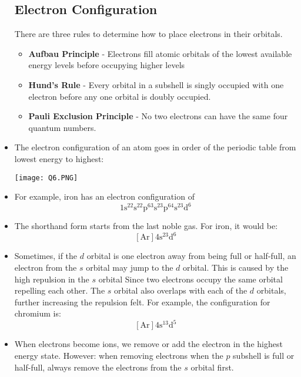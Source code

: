 \documentclass{article}
\begin{document}
\begin{itemize}
    \subsection{Electron Configuration}
    \begin{review}
        There are three rules to determine how to place electrons in their orbitals.
        \begin{itemize}
            \item \textbf{Aufbau Principle} - Electrons fill atomic orbitals of the lowest available energy levels before occupying higher levels
            \item \textbf{Hund's Rule} - Every orbital in a subshell is singly occupied with one electron before any one orbital is doubly occupied.
            \item \textbf{Pauli Exclusion Principle} - No two electrons can have the same four quantum numbers.
        \end{itemize}
    \end{review}
    \item The electron configuration of an atom goes in order of the periodic table from lowest energy to highest:
    \begin{center}\texttt{[image: Q6.PNG]}\end{center}
    \item For example, iron has an electron configuration of
    $$\mathrm{1s^22s^22p^63s^23p^64s^23d^6}$$
    \item The shorthand form starts from the last noble gas. For iron, it would be:
    $$\mathrm{[Ar]4s^23d^6}$$
    \item Sometimes, if the $d$ orbital is one electron away from being full or half-full, an electron from the $s$ orbital may jump to the $d$ orbital. This is caused by the high repulsion in the $s$ orbital Since two electrons occupy the same orbital repelling each other. The $s$ orbital also overlaps with each of the $d$ orbitals, further increasing the repulsion felt. For example, the configuration for chromium is:
    $$\mathrm{[Ar]4s^13d^5}$$
    \item When electrons become ions, we remove or add the electron in the highest energy state. However: when removing electrons when the $p$ subshell is full or half-full, always remove the electrons from the $s$ orbital first. 

\end{itemize}
\end{document}
